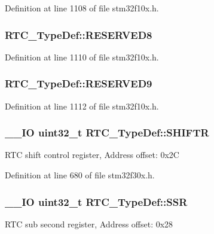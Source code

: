 Definition at line 1108 of file stm32f10x.\-h.

\hypertarget{struct_r_t_c___type_def_a5b09d77c801dc948581ef113d8a352c9}{
\subsubsection[{R\-E\-S\-E\-R\-V\-E\-D8}]{ R\-T\-C\-\_\-\-Type\-Def\-::\-R\-E\-S\-E\-R\-V\-E\-D8}}\label{struct_r_t_c___type_def_a5b09d77c801dc948581ef113d8a352c9}


Definition at line 1110 of file stm32f10x.\-h.

\hypertarget{struct_r_t_c___type_def_a3f83ce9cfda0c0e7f854ab65347058b1}{
\subsubsection[{R\-E\-S\-E\-R\-V\-E\-D9}]{ R\-T\-C\-\_\-\-Type\-Def\-::\-R\-E\-S\-E\-R\-V\-E\-D9}}\label{struct_r_t_c___type_def_a3f83ce9cfda0c0e7f854ab65347058b1}


Definition at line 1112 of file stm32f10x.\-h.

\hypertarget{struct_r_t_c___type_def_a6082856c9191f5003b6163c0d3afcaff}{
\subsubsection[{S\-H\-I\-F\-T\-R}]{\setlength{\rightskip}{0pt plus 5cm}\-\_\-\-\_\-\-I\-O {\bf uint32\-\_\-t} R\-T\-C\-\_\-\-Type\-Def\-::\-S\-H\-I\-F\-T\-R}}\label{struct_r_t_c___type_def_a6082856c9191f5003b6163c0d3afcaff}
R\-T\-C shift control register, Address offset\-: 0x2\-C 

Definition at line 680 of file stm32f30x.\-h.

\hypertarget{struct_r_t_c___type_def_aefbd38be87117d1fced289bf9c534414}{
\subsubsection[{S\-S\-R}]{\setlength{\rightskip}{0pt plus 5cm}\-\_\-\-\_\-\-I\-O {\bf uint32\-\_\-t} R\-T\-C\-\_\-\-Type\-Def\-::\-S\-S\-R}}\label{struct_r_t_c___type_def_aefbd38be87117d1fced289bf9c534414}
R\-T\-C sub second register, Address offset\-: 0x28 

